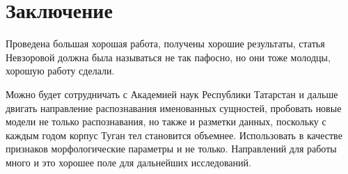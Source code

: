 \section{Заключение}

Проведена большая хорошая работа, получены хорошие результаты, статья Невзоровой должна была называться не так пафосно, но они тоже молодцы, хорошую работу сделали.

Можно будет сотрудничать с Академией наук Республики Татарстан и дальше двигать направление распознавания именованных сущностей, пробовать новые модели не только распознавания, но также и разметки данных, поскольку с каждым годом корпус Туган тел становится объемнее. Использовать в качестве признаков морфологические параметры и не только. Направлений для работы много и это хорошее поле для дальнейших исследований.